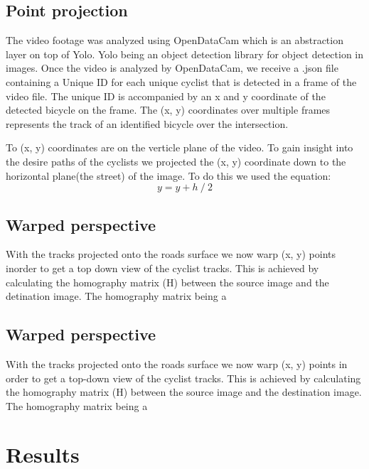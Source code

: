 \documentclass[10pt, a4paper, twocolumn]{article} %
\begin{document}
\subsection{Point projection}
The video footage was analyzed using OpenDataCam which is an abstraction layer on top of Yolo. Yolo being an object detection library for object detection in images.
Once the video is analyzed by OpenDataCam, we receive a .json file containing a Unique ID for each unique cyclist that is detected in a frame of the video file. 
The unique ID is accompanied by an x and y coordinate of the detected bicycle on the frame. The (x, y) coordinates over multiple frames represents the track of an identified bicycle over the intersection.

To (x, y) coordinates are on the verticle plane of the video. To gain insight into the desire paths of the cyclists we projected the (x, y) coordinate down to the horizontal plane(the street) of the image.
To do this we used the equation: 
\begin{equation}
	y = y + h ⁄ 2
\end{equation}

\subsection{Warped perspective}
With the tracks projected onto the roads surface we now warp (x, y) points inorder to get a top down view of the cyclist tracks.
This is achieved by calculating the homography matrix (H) between the source image and the detination image. The homography matrix being a 


\subsection{Warped perspective}
With the tracks projected onto the roads surface we now warp (x, y) points in order to get a top-down view of the cyclist tracks.
This is achieved by calculating the homography matrix (H) between the source image and the destination image. The homography matrix being a 

\section{Results}
\end{document}
